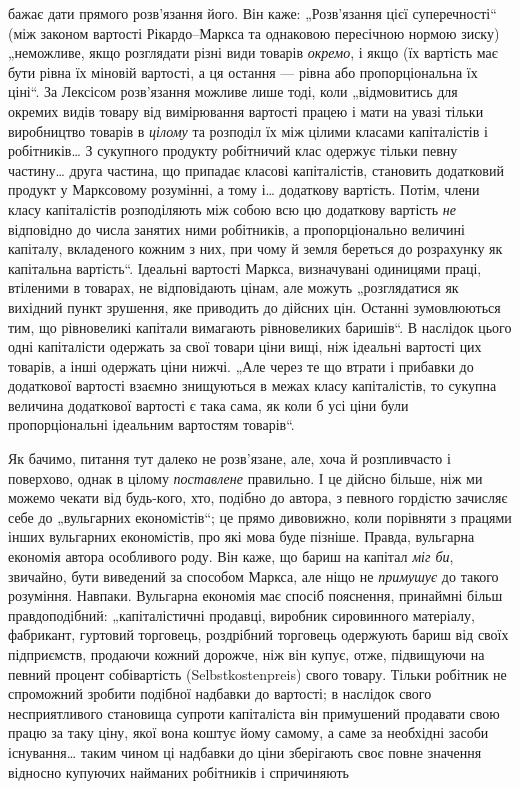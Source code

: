 \parcont{}  %
бажає дати прямого розв’язання його. Він каже: „Розв’язання
цієї суперечності“ (між законом вартості Рікардо--Маркса та однаковою
пересічною нормою зиску) „неможливе, якщо розглядати
різні види товарів \emph{окремо}, і якщо (їх вартість має бути
рівна їх міновій вартості, а ця остання — рівна або пропорціональна
їх ціні“. За Лексісом розв’язання можливе лише тоді,
коли „відмовитись для окремих видів товару від вимірювання
вартості працею і мати на увазі тільки виробництво товарів
в \emph{цілому} та розподіл їх між цілими класами капіталістів і робітників\dots{}
З сукупного продукту робітничий клас одержує тільки
певну частину\dots{} друга частина, що припадає класові капіталістів,
становить додатковий продукт у Марксовому розумінні, а тому і\dots{}
додаткову вартість. Потім, члени класу капіталістів розподіляють
між собою всю цю додаткову вартість \emph{не} відповідно до числа
занятих ними робітників, а пропорціонально величині капіталу,
вкладеного кожним з них, при чому й земля береться до розрахунку
як капітальна вартість“. Ідеальні вартості Маркса, визначувані
одиницями праці, втіленими в товарах, не відповідають
цінам, але можуть „розглядатися як вихідний пункт зрушення,
яке приводить до дійсних цін. Останні зумовлюються тим, що
рівновеликі капітали вимагають рівновеликих баришів“. В наслідок
цього одні капіталісти одержать за свої товари ціни вищі,
ніж ідеальні вартості цих товарів, а інші одержать ціни нижчі.
„Але через те що втрати і прибавки до додаткової вартості
взаємно знищуються в межах класу капіталістів, то сукупна
величина додаткової вартості є така сама, як коли б усі ціни
були пропорціональні ідеальним вартостям товарів“.

Як бачимо, питання тут далеко не розв’язане, але, хоча й
розпливчасто і поверхово, однак в цілому \emph{поставлене} правильно.
І це дійсно більше, ніж ми можемо чекати від будь-кого,
хто, подібно до автора, з певного гордістю зачисляє себе
до „вульгарних економістів“; це прямо дивовижно, коли порівняти
з працями інших вульгарних економістів, про які мова буде
пізніше. Правда, вульгарна економія автора особливого роду.
Він каже, що бариш на капітал \emph{міг би}, звичайно, бути виведений
за способом Маркса, але ніщо не \emph{примушує} до такого розуміння.
Навпаки. Вульгарна економія має спосіб пояснення, принаймні
більш правдоподібний: „капіталістичні продавці, виробник
сировинного матеріалу, фабрикант, гуртовий торговець,
роздрібний торговець одержують бариш від своїх підприємств,
продаючи кожний дорожче, ніж він купує, отже, підвищуючи
на певний процент собівартість (Selbstkostenpreis) свого товару.
Тільки робітник не спроможний зробити подібної надбавки до
вартості; в наслідок свого несприятливого становища супроти
капіталіста він примушений продавати свою працю за таку ціну,
якої вона коштує йому самому, а саме за необхідні засоби існування\dots{}
таким чином ці надбавки до ціни зберігають своє повне
значення відносно купуючих найманих робітників і спричиняють
\parbreak{}  %
